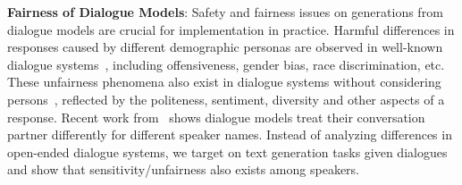 







\textbf{Fairness of Dialogue Models}: 
Safety and fairness issues on generations from dialogue models are crucial for implementation in practice. Harmful differences in responses caused by different demographic personas are observed in well-known dialogue systems~\cite{sheng2021revealing,dinan2020queens}, including offensiveness, gender bias, race discrimination, etc. These unfairness phenomena also exist in dialogue systems without considering persons~\cite{liu2020does}, reflected by the politeness, sentiment, diversity and other aspects of a response. Recent work from~\cite{smith2021hi} shows dialogue models treat their conversation partner differently for different speaker names. Instead of analyzing differences in open-ended dialogue systems, we target on text generation tasks given dialogues and show that sensitivity/unfairness also exists among speakers.





